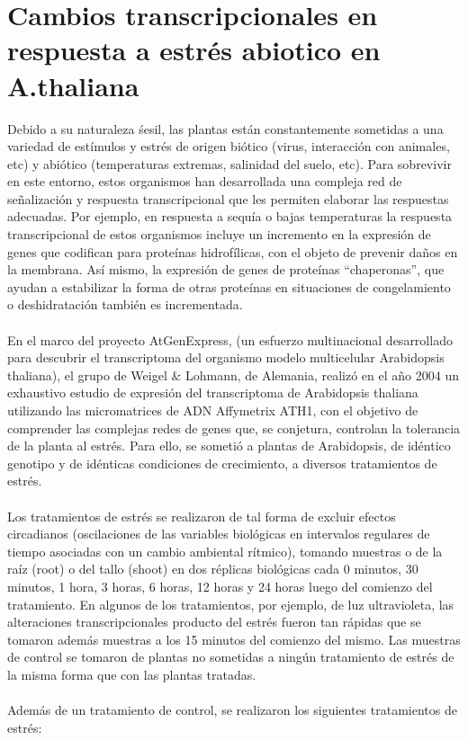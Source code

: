 \section{Cambios transcripcionales en respuesta a estrés abiotico en A.thaliana}\label{sec:wiegel}
Debido a su naturaleza śesil, las plantas están constantemente sometidas a una variedad de estímulos y estrés de origen biótico (virus, interacción con animales, etc) y abiótico (temperaturas extremas, salinidad del suelo, etc). Para sobrevivir en este entorno, estos organismos han desarrollada una compleja red de señalización y respuesta transcripcional que les permiten elaborar las respuestas adecuadas. Por ejemplo, en respuesta a sequía o bajas temperaturas la respuesta transcripcional de estos organismos incluye un incremento en la expresión de genes que codifican para proteínas hidrofílicas, con el objeto de prevenir daños en la membrana. Así mismo, la expresión de genes de proteínas ``chaperonas'', que ayudan a estabilizar la forma de otras proteínas
en situaciones de congelamiento o deshidratación también es incrementada.\\\\
En el marco del proyecto AtGenExpress, (un esfuerzo multinacional desarrollado para descubrir el transcriptoma del organismo modelo multicelular Arabidopsis thaliana), el grupo de Weigel \& Lohmann, de Alemania, realizó en el año 2004 un exhaustivo estudio de expresión del transcriptoma de Arabidopsis thaliana utilizando las micromatrices de ADN Affymetrix ATH1, con el objetivo de comprender las complejas redes de genes que, se conjetura, controlan la tolerancia de la planta al estrés. Para ello, se sometió a plantas de Arabidopsis, de idéntico genotipo y de idénticas condiciones de crecimiento, a diversos tratamientos de estrés.\\\\
Los tratamientos de estrés se realizaron de tal forma de excluir efectos circadianos (oscilaciones de las variables biológicas en intervalos regulares de tiempo asociadas con un cambio ambiental rítmico), tomando muestras o de la raíz (root) o del tallo (shoot) en dos réplicas biológicas cada 0 minutos, 30 minutos, 1 hora, 3 horas, 6 horas, 12 horas y 24 horas luego del comienzo del tratamiento. En algunos de los tratamientos, por ejemplo, de luz ultravioleta, las alteraciones transcripcionales producto del estrés fueron tan rápidas que se tomaron además muestras a los 15 minutos del comienzo  del mismo. Las muestras de control se tomaron de plantas no sometidas a ningún tratamiento de estrés de la misma forma que con las plantas tratadas.\\\\
Además de un tratamiento de control, se realizaron los siguientes tratamientos de estrés:
